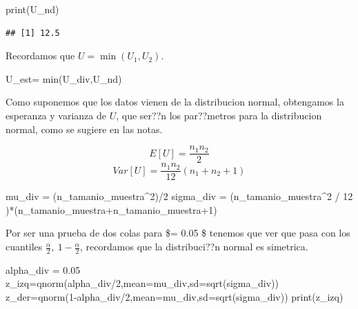 \documentclass[
]{article}
\newenvironment{Shaded}{\begin{snugshade}}{\end{snugshade}}
\newcommand{\AttributeTok}[1]{\textcolor[rgb]{0.77,0.63,0.00}{#1}}
\newcommand{\DecValTok}[1]{\textcolor[rgb]{0.00,0.00,0.81}{#1}}
\newcommand{\FloatTok}[1]{\textcolor[rgb]{0.00,0.00,0.81}{#1}}
\newcommand{\FunctionTok}[1]{\textcolor[rgb]{0.00,0.00,0.00}{#1}}
\newcommand{\NormalTok}[1]{#1}
\newcommand{\OtherTok}[1]{\textcolor[rgb]{0.56,0.35,0.01}{#1}}
\newcommand{\SpecialCharTok}[1]{\textcolor[rgb]{0.00,0.00,0.00}{#1}}
\begin{document}
\begin{Shaded}
\begin{Highlighting}[]
\FunctionTok{print}\NormalTok{(U\_nd)}
\end{Highlighting}
\end{Shaded}

\begin{verbatim}
## [1] 12.5
\end{verbatim}

Recordamos que \(U=\min(U_{1},U_{2} )\).

\begin{Shaded}
\begin{Highlighting}[]
\NormalTok{U\_est}\OtherTok{=} \FunctionTok{min}\NormalTok{(U\_div,U\_nd)}
\end{Highlighting}
\end{Shaded}

Como suponemos que los datos vienen de la distribucion normal,
obtengamos la esperanza y varianza de \(U\), que ser??n los par??metros
para la distribucion normal, como se sugiere en las notas.

\[E[U]= \frac{n_{1}n_{2} }{2}\]
\[Var[U] = \frac{n_{1}n_{2}}{12}(n_{1}+n_{2}+1) \]

\begin{Shaded}
\begin{Highlighting}[]
\NormalTok{mu\_div }\OtherTok{=}\NormalTok{ (n\_tamanio\_muestra}\SpecialCharTok{\^{}}\DecValTok{2}\NormalTok{)}\SpecialCharTok{/}\DecValTok{2}
\NormalTok{sigma\_div }\OtherTok{=}\NormalTok{ (n\_tamanio\_muestra}\SpecialCharTok{\^{}}\DecValTok{2} \SpecialCharTok{/} \DecValTok{12}\NormalTok{ )}\SpecialCharTok{*}\NormalTok{(n\_tamanio\_muestra}\SpecialCharTok{+}\NormalTok{n\_tamanio\_muestra}\SpecialCharTok{+}\DecValTok{1}\NormalTok{)}
\end{Highlighting}
\end{Shaded}

Por ser una prueba de dos colas para \$\alpha= 0.05 \$ tenemos que ver
que pasa con los cuantiles \(\frac{\alpha}{2}, \ 1-\frac{\alpha}{2}\),
recordamos que la distribuci??n normal es simetrica.

\begin{Shaded}
\begin{Highlighting}[]
\NormalTok{alpha\_div }\OtherTok{=} \FloatTok{0.05}
\NormalTok{z\_izq}\OtherTok{=}\FunctionTok{qnorm}\NormalTok{(alpha\_div}\SpecialCharTok{/}\DecValTok{2}\NormalTok{,}\AttributeTok{mean=}\NormalTok{mu\_div,}\AttributeTok{sd=}\FunctionTok{sqrt}\NormalTok{(sigma\_div))}
\NormalTok{z\_der}\OtherTok{=}\FunctionTok{qnorm}\NormalTok{(}\DecValTok{1}\SpecialCharTok{{-}}\NormalTok{alpha\_div}\SpecialCharTok{/}\DecValTok{2}\NormalTok{,}\AttributeTok{mean=}\NormalTok{mu\_div,}\AttributeTok{sd=}\FunctionTok{sqrt}\NormalTok{(sigma\_div))}
\FunctionTok{print}\NormalTok{(z\_izq)}
\end{Highlighting}
\end{Shaded}
\end{document}
